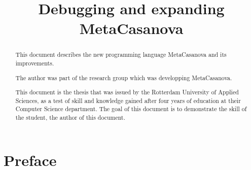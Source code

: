 


\title{Debugging and expanding MetaCasanova}
\author{\writer}

\begin{titlepage}
   
\end{titlepage}

\begin{multicols}{3}

   \begin{abstract}
      This document describes the new programming language MetaCasanova and its improvements.

The author was part of the research group which was developping MetaCasanova.

This document is the thesis that was issued by the Rotterdam University of Applied Sciences, as a test of skill and knowledge gained after four years of education at their Computer Science department.
The goal of this document is to demonstrate the skill of the student, the author of this document.
   \end{abstract}
   \newpage


   \setcounter{tocdepth}{1}
   \tableofcontents
   \cleardoublepage
   \addtocounter{page}{4}
\end{multicols}


\part{Preface}
% 
\begin{multicols}{3}
   

\end{multicols}

